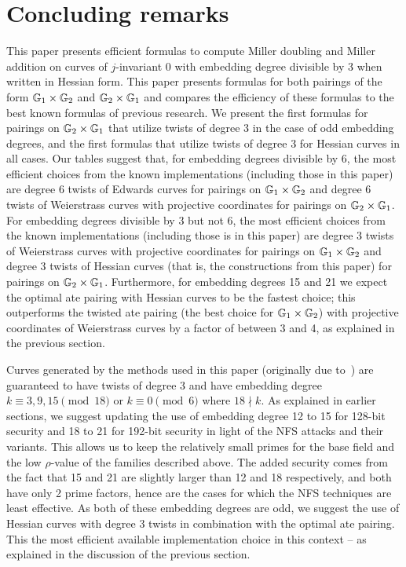 \section{Concluding remarks}
\label{sec:conclude}

This paper presents efficient formulas to compute Miller doubling and Miller addition on curves of $j$-invariant 0 with embedding degree divisible by 3 when written in Hessian form.
This paper presents formulas for both pairings of the form $\mathbb{G}_{1} \times \mathbb{G}_{2}$ and $\mathbb{G}_{2} \times \mathbb{G}_{1}$ and compares the efficiency of these formulas to the best known formulas of previous research.
We present the first formulas for pairings on $\mathbb{G}_{2} \times \mathbb{G}_{1}$ that utilize twists of degree 3 in the case of odd embedding degrees, and the first formulas that utilize twists of degree 3 for Hessian curves in all cases. Our tables suggest that, for embedding degrees divisible by 6, the most efficient choices from the known implementations (including those in this paper) are degree 6 twists of Edwards curves for pairings on $\mathbb{G}_{1} \times \mathbb{G}_{2}$ and degree 6 twists of Weierstrass curves with projective coordinates for pairings on $\mathbb{G}_{2} \times \mathbb{G}_{1}$.
For embedding degrees divisible by 3 but not 6, the most efficient choices from the 
known implementations (including those is in this paper) are degree 3 twists of Weierstrass curves with projective coordinates for pairings on $\mathbb{G}_{1} \times \mathbb{G}_{2}$ 
and degree 3 twists of Hessian curves (that is, the constructions from this paper) for pairings on $\mathbb{G}_{2} \times \mathbb{G}_{1}$. 
Furthermore, for embedding degrees 15 and 21 we expect the optimal ate pairing with Hessian curves to be the fastest choice; this outperforms
the twisted ate pairing (the best choice for $\mathbb{G}_{1} \times \mathbb{G}_{2}$) with projective coordinates of Weierstrass curves by a factor of between 3 and 4, as explained in the previous section.

Curves generated by the methods used in this paper (originally due to~\cite{2010/freeman}) are guaranteed to have twists of degree $3$
and have embedding degree
$k \equiv 3,9,15 \pmod{18}$ or
$k \equiv 0 \pmod{6}$ where $18 \nmid k$.
As explained in earlier sections, we suggest updating the use of embedding degree 12 to 15 for 128-bit security and 18 to 21 for 192-bit security in light of the NFS attacks and their variants. This allows us to keep the relatively small primes for the base field and the low $\rho$-value of the families described above. The added security comes from the fact that 15 and 21 are slightly larger than 12 and 18 respectively, and both have only 2 prime factors, hence are the cases for which the NFS techniques are least effective. 
As both of these embedding degrees are odd, we suggest the use of Hessian curves with degree 3 twists in combination with the optimal ate pairing. 
This the most efficient available implementation choice in this context -- as explained in the discussion of the previous section.

